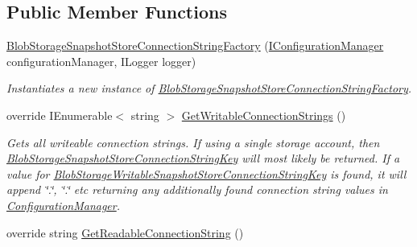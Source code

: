 \subsection*{Public Member Functions}
\begin{DoxyCompactItemize}
\item 
\hyperlink{classCqrs_1_1Azure_1_1BlobStorage_1_1Events_1_1BlobStorageSnapshotStoreConnectionStringFactory_a40f386283f31751113ff2e6db02d6d07_a40f386283f31751113ff2e6db02d6d07}{Blob\+Storage\+Snapshot\+Store\+Connection\+String\+Factory} (\hyperlink{interfaceCqrs_1_1Configuration_1_1IConfigurationManager}{I\+Configuration\+Manager} configuration\+Manager, I\+Logger logger)
\begin{DoxyCompactList}\small\item\em Instantiates a new instance of \hyperlink{classCqrs_1_1Azure_1_1BlobStorage_1_1Events_1_1BlobStorageSnapshotStoreConnectionStringFactory}{Blob\+Storage\+Snapshot\+Store\+Connection\+String\+Factory}. \end{DoxyCompactList}\item 
override I\+Enumerable$<$ string $>$ \hyperlink{classCqrs_1_1Azure_1_1BlobStorage_1_1Events_1_1BlobStorageSnapshotStoreConnectionStringFactory_a3b0a626033bedf1dc33951266ac656e4_a3b0a626033bedf1dc33951266ac656e4}{Get\+Writable\+Connection\+Strings} ()
\begin{DoxyCompactList}\small\item\em Gets all writeable connection strings. If using a single storage account, then \hyperlink{classCqrs_1_1Azure_1_1BlobStorage_1_1Events_1_1BlobStorageSnapshotStoreConnectionStringFactory_a9638ce6d0077def1e742b688e4581874_a9638ce6d0077def1e742b688e4581874}{Blob\+Storage\+Snapshot\+Store\+Connection\+String\+Key} will most likely be returned. If a value for \hyperlink{classCqrs_1_1Azure_1_1BlobStorage_1_1Events_1_1BlobStorageSnapshotStoreConnectionStringFactory_a5b920e37137fbfb098eb74a7177c1de7_a5b920e37137fbfb098eb74a7177c1de7}{Blob\+Storage\+Writable\+Snapshot\+Store\+Connection\+String\+Key} is found, it will append \char`\"{}.\char`\"{}, \char`\"{}.\char`\"{} etc returning any additionally found connection string values in \hyperlink{namespaceCqrs_1_1Azure_1_1ConfigurationManager}{Configuration\+Manager}. \end{DoxyCompactList}\item 
override string \hyperlink{classCqrs_1_1Azure_1_1BlobStorage_1_1Events_1_1BlobStorageSnapshotStoreConnectionStringFactory_ab226acce237117b81f7ea577b2190697_ab226acce237117b81f7ea577b2190697}{Get\+Readable\+Connection\+String} ()

\end{DoxyCompactItemize}
